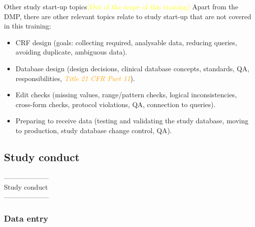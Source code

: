 \documentclass[xcolor=dvipsnames,11pt]{beamer}
\begin{document}
\begin{frame}[fragile]{Other study start-up topics}{\textcolor{yellow}{(Out of the scope of this training)}}
	Apart from the DMP, there are other relevant topics relate to study start-up that are not covered in this training:\\
	\medskip
	\begin{itemize}
		\item CRF design (goals: collecting required, analysable data, reducing queries, avoiding duplicate, ambiguous data).
		\item Database design (design decisions, clinical database concepts, standards, QA, responsibilities, \textcolor{orange}{\textit{Title 21 CFR Part 11}}).
		\item Edit checks (missing values, range/pattern checks, logical inconsistencies, cross-form checks, protocol violations, QA, connection to queries).
		\item Preparing to receive data (testing and validating the study database, moving to production, study database change control, QA).
	\end{itemize}
\end{frame}

\subsection{Study conduct}
\begin{frame}{}
	\bigskip\bigskip\bigskip\bigskip\bigskip\bigskip
	\begin{center}
		\textcolor{PineGreen}{--------------------\\Study conduct\\--------------------}
	\end{center}
\end{frame}

\subsubsection{Data entry}
\end{document}
